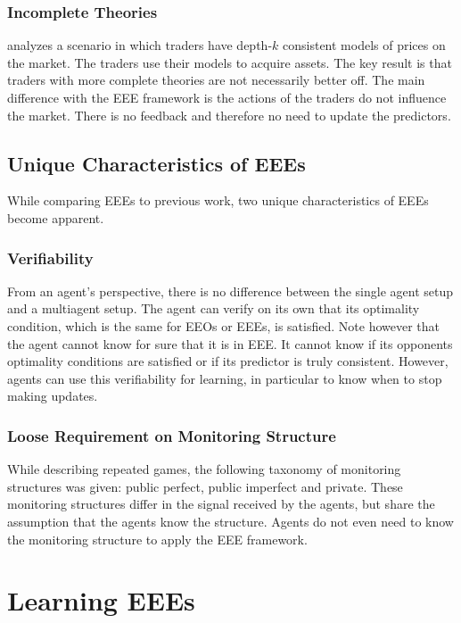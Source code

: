 \subsubsection{Incomplete Theories}
\cite{eyster_piccione:2011} analyzes a scenario in which traders have depth-\(k\) consistent models of prices on the market.
The traders use their models to acquire assets.
The key result is that traders with more complete theories are not necessarily better off.
The main difference with the EEE framework is the actions of the traders do not influence the market.
There is no feedback and therefore no need to update the predictors.

\subsection{Unique Characteristics of EEEs}

While comparing EEEs to previous work, two unique characteristics of EEEs become apparent.

\subsubsection{Verifiability}
From an agent's perspective, there is no difference between the single agent setup and a multiagent setup.
The agent can verify on its own that its optimality condition, which is the same for EEOs or EEEs, is satisfied.
Note however that the agent cannot know for sure that it is in EEE.
It cannot know if its opponents optimality conditions are satisfied or if its predictor is truly consistent.
However, agents can use this verifiability for learning, in particular to know when to stop making updates.

\subsubsection{Loose Requirement on Monitoring Structure}
While describing repeated games, the following taxonomy of monitoring structures was given: public perfect, public imperfect and private.
These monitoring structures differ in the signal received by the agents, but share the assumption that the agents know the structure.
Agents do not even need to know the monitoring structure to apply the EEE framework.


\section{Learning EEEs}
\label{sec:learning_eees}


